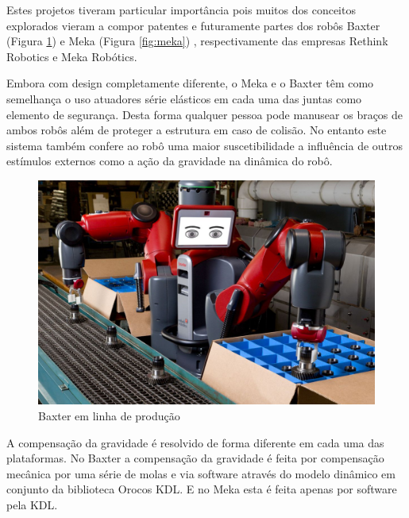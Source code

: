 Estes projetos tiveram particular importância pois muitos dos conceitos explorados vieram a compor patentes e futuramente partes dos robôs Baxter (Figura \ref{fig:baxter}) e Meka (Figura \ref{fig:meka}) , respectivamente das empresas Rethink Robotics e Meka Robótics. %

Embora com design completamente diferente, o Meka e o Baxter têm como semelhança o uso atuadores série elásticos em cada uma das juntas como elemento de segurança. Desta forma qualquer pessoa pode manusear os braços de ambos robôs além de proteger a estrutura em caso de colisão\cite{pratt1995series}. No entanto este sistema também confere ao robô uma maior suscetibilidade a influência de outros estímulos externos como a ação da gravidade na dinâmica do robô.

\begin{figure}[H]
    \centering
    \includegraphics[width = 0.6\linewidth]{tex/figs/baxter_production.jpg}
    \caption{Baxter em linha de produção}
    \label{fig:baxter}
\end{figure}

A compensação da gravidade é resolvido de forma diferente em cada uma das plataformas. No Baxter a compensação da gravidade é feita por compensação mecânica por uma série de molas e via software através do modelo dinâmico em conjunto da biblioteca Orocos KDL\cite{baxterguide}. E no Meka esta é feita apenas por software pela KDL.\cite{mekaguide}


